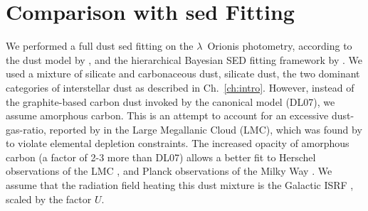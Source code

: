         \section{Comparison with \acrshort{sed} Fitting}
          We performed a full dust \acrshort{sed} fitting on the $\lambda$~Orionis photometry, according to the dust model by \cite{galliano11}, and the hierarchical Bayesian SED fitting framework by \cite{galliano18}.  We used a mixture of silicate and carbonaceous dust, silicate dust, the two dominant categories of interstellar dust as described in Ch.~\ref{ch:intro}. However, instead of the graphite-based carbon dust invoked by the canonical \cite{draine07} model (DL07), we assume amorphous carbon. This is an attempt to account for an excessive dust-gas-ratio, reported by \cite{israel10, bot10} in the Large Megallanic Cloud (LMC), which was found by \cite{galliano11} to violate elemental depletion constraints. The increased opacity of amorphous carbon (a factor of 2-3 more than DL07) allows a better fit to Herschel observations of the LMC \citep{galliano11}, and Planck observations of the Milky Way \citep{planckIntXXIX16}. We assume that the radiation field heating this dust mixture is the Galactic ISRF \citep{mathis83}, scaled by the factor $U$.

